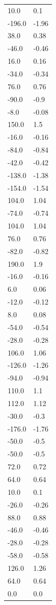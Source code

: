 \begin{longtable}{ll}
10.0 & 0.1 \\
-196.0 & -1.96 \\
38.0 & 0.38 \\
-46.0 & -0.46 \\
16.0 & 0.16 \\
-34.0 & -0.34 \\
76.0 & 0.76 \\
-90.0 & -0.9 \\
-8.0 & -0.08 \\
150.0 & 1.5 \\
-16.0 & -0.16 \\
-84.0 & -0.84 \\
-42.0 & -0.42 \\
-138.0 & -1.38 \\
-154.0 & -1.54 \\
104.0 & 1.04 \\
-74.0 & -0.74 \\
104.0 & 1.04 \\
76.0 & 0.76 \\
-82.0 & -0.82 \\
190.0 & 1.9 \\
-16.0 & -0.16 \\
6.0 & 0.06 \\
-12.0 & -0.12 \\
8.0 & 0.08 \\
-54.0 & -0.54 \\
-28.0 & -0.28 \\
106.0 & 1.06 \\
-126.0 & -1.26 \\
-94.0 & -0.94 \\
110.0 & 1.1 \\
112.0 & 1.12 \\
-30.0 & -0.3 \\
-176.0 & -1.76 \\
-50.0 & -0.5 \\
-50.0 & -0.5 \\
72.0 & 0.72 \\
64.0 & 0.64 \\
10.0 & 0.1 \\
-26.0 & -0.26 \\
88.0 & 0.88 \\
-46.0 & -0.46 \\
-28.0 & -0.28 \\
-58.0 & -0.58 \\
126.0 & 1.26 \\
64.0 & 0.64 \\
0.0 & 0.0 \\

\end{longtable}
